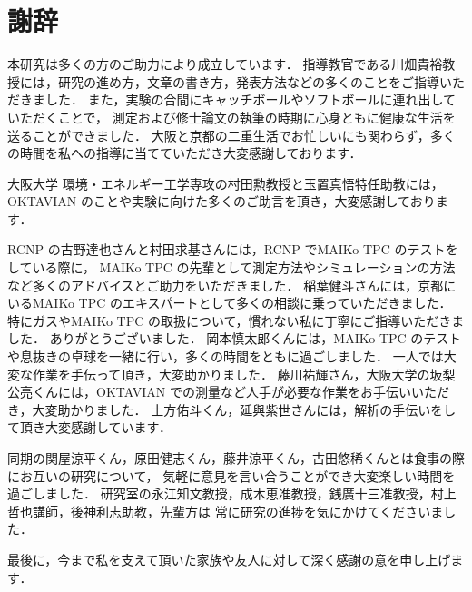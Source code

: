 \documentclass[../master]{subfiles}
\begin{document}
\chapter*{謝辞}
本研究は多くの方のご助力により成立しています．
指導教官である川畑貴裕教授には，研究の進め方，文章の書き方，発表方法などの多くのことをご指導いただきました．
また，実験の合間にキャッチボールやソフトボールに連れ出していただくことで，
測定および修士論文の執筆の時期に心身ともに健康な生活を送ることができました．
大阪と京都の二重生活でお忙しいにも関わらず，多くの時間を私への指導に当てていただき大変感謝しております．

大阪大学 環境・エネルギー工学専攻の村田勲教授と玉置真悟特任助教には，
OKTAVIAN のことや実験に向けた多くのご助言を頂き，大変感謝しております．

RCNP の古野達也さんと村田求基さんには，RCNP でMAIKo TPC のテストをしている際に，
MAIKo TPC の先輩として測定方法やシミュレーションの方法など多くのアドバイスとご助力をいただきました．
稲葉健斗さんには，京都にいるMAIKo TPC のエキスパートとして多くの相談に乗っていただきました．
特にガスやMAIKo TPC の取扱について，慣れない私に丁寧にご指導いただきました．
ありがとうございました．
岡本慎太郎くんには，MAIKo TPC のテストや息抜きの卓球を一緒に行い，多くの時間をともに過ごしました．
一人では大変な作業を手伝って頂き，大変助かりました．
藤川祐輝さん，大阪大学の坂梨公亮くんには，OKTAVIAN での測量など人手が必要な作業をお手伝いいただき，大変助かりました．
土方佑斗くん，延與紫世さんには，解析の手伝いをして頂き大変感謝しています．

同期の関屋涼平くん，原田健志くん，藤井涼平くん，古田悠稀くんとは食事の際にお互いの研究について，
気軽に意見を言い合うことができ大変楽しい時間を過ごしました．
研究室の永江知文教授，成木恵准教授，銭廣十三准教授，村上哲也講師，後神利志助教，先輩方は
常に研究の進捗を気にかけてくださいました．

最後に，今まで私を支えて頂いた家族や友人に対して深く感謝の意を申し上げます．
\end{document}
